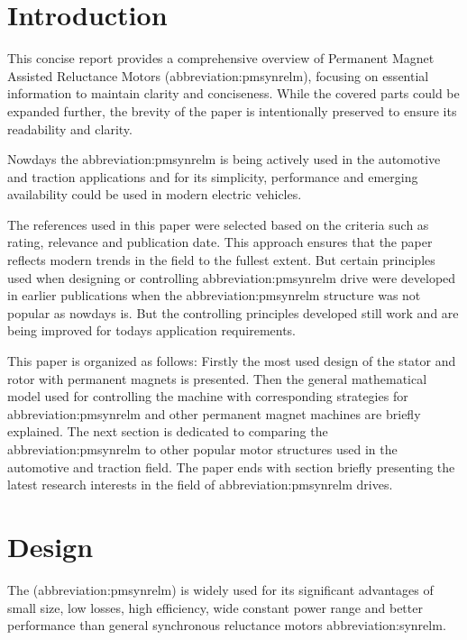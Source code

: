 \documentclass[a4paper, twoside, 11pt]{article}
\begin{document}
\section{Introduction}
This concise report provides a comprehensive overview of Permanent Magnet Assisted Reluctance Motors (\gls{abbreviation:pmsynrelm}),  focusing on essential information to maintain clarity and conciseness. While the covered parts could be expanded further, the brevity of the paper is intentionally preserved to ensure its readability and clarity.\par
Nowdays the \gls{abbreviation:pmsynrelm} is being actively used in the automotive and traction applications and for its simplicity, performance and emerging availability could be used in modern electric vehicles. \par
The references used in this paper were selected based on the criteria such as rating, relevance and publication date. This approach ensures that the paper reflects modern trends in the field to the fullest extent. But certain principles used when designing or controlling \gls{abbreviation:pmsynrelm} drive were developed in earlier publications when the \gls{abbreviation:pmsynrelm} structure was not popular as nowdays is. But the controlling principles developed still work and are being improved for todays application requirements.\par
This paper is organized as follows: Firstly the most used design of the stator and rotor with permanent magnets is presented. Then the general mathematical model used for controlling the machine with corresponding strategies for \gls{abbreviation:pmsynrelm} and other permanent magnet machines are briefly explained. The next section is dedicated to comparing the \gls{abbreviation:pmsynrelm} to other popular motor structures used in the automotive and traction field. The paper ends with section briefly presenting the latest research interests in the field of \gls{abbreviation:pmsynrelm} drives.

\newpage
\section{Design}
The (\gls{abbreviation:pmsynrelm}) is widely used for its significant advantages of small size, low losses, high efficiency, wide constant power range and better performance than general synchronous reluctance motors \gls{abbreviation:synrelm}. \cite{xinmin-design-of-permanent-magnet-assisted-synch-rel-m-with-low-torque-ripple,huynh-design-and-analysis-of-perm-as-synch-rel-m}
\end{document}
